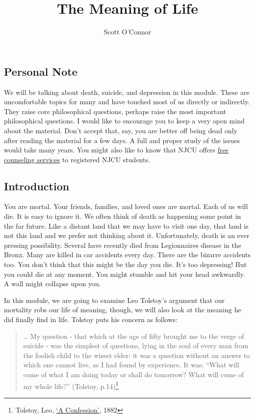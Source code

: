 \documentclass[10pt]{article}
\title{The Meaning of Life}
\author{Scott O’Connor}
\begin{document}
\maketitle

\subsection{Personal Note}\label{personal-note}

We will be talking about death, suicide, and depression in this module.
These are uncomfortable topics for many and have touched most of us
directly or indirectly. They raise core philosophical questions, perhaps
raise the most important philosophical questions. I would like to
encourage you to keep a very open mind about the material. Don't accept
that, say, you are better off being dead only after reading the material
for a few days. A full and proper study of the issues would take many
years. You might also like to know that NJCU offers
\href{http://www.njcu.edu/counselingcenter}{free counseling services} to
registered NJCU students.

\subsection{Introduction}\label{introduction}

You are mortal. Your friends, families, and loved ones are mortal. Each
of us will die. It is easy to ignore it. We often think of death as
happening some point in the far future. Like a distant land that we may
have to visit one day, that land is not this land and we prefer not
thinking about it. Unfortunately, death is an ever pressing possibility.
Several have recently died from Legionnaires disease in the Bronx. Many
are killed in car accidents every day. There are the bizarre accidents
too. You don't think that this might be the day you die. It's too
depressing! But you could die at any moment. You might stumble and hit
your head awkwardly. A wall might collapse upon you.

In this module, we are going to examine Leo Tolstoy's argument that our
mortality robs our life of meaning, though, we will also look at the
meaning he did finally find in life. Tolstoy puts his concern as
follows:

\begin{quote}
\ldots{} My question - that which at the age of fifty brought me to the
verge of suicide - was the simplest of questions, lying in the soul of
every man from the foolish child to the wisest elder: it was a question
without an answer to which one cannot live, as I had found by
experience. It was: ``What will come of what I am doing today or shall
do tomorrow? What will come of my whole life?'' (Tolstoy, p.14)\footnote{Tolstoy, Leo, \href{/Teaching/Examined/Meaning/Tolstoy.pdf}{`A
  Confession'}, 1882}
\end{quote}
\end{document}
